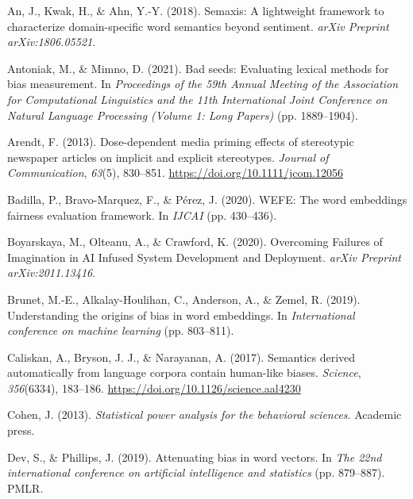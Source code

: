 \documentclass[english,man]{apa6}
\begin{document}
\begingroup
\setlength{\parindent}{-0.5in}
\setlength{\leftskip}{0.5in}

\hypertarget{refs}{}
\leavevmode\hypertarget{ref-an2018semaxis}{}%
An, J., Kwak, H., \& Ahn, Y.-Y. (2018). Semaxis: A lightweight framework to characterize domain-specific word semantics beyond sentiment. \emph{arXiv Preprint arXiv:1806.05521}.

\leavevmode\hypertarget{ref-antoniak2021bad}{}%
Antoniak, M., \& Mimno, D. (2021). Bad seeds: Evaluating lexical methods for bias measurement. In \emph{Proceedings of the 59th Annual Meeting of the Association for Computational Linguistics and the 11th International Joint Conference on Natural Language Processing (Volume 1: Long Papers)} (pp. 1889--1904).

\leavevmode\hypertarget{ref-arendt:2013:DDM}{}%
Arendt, F. (2013). Dose-dependent media priming effects of stereotypic newspaper articles on implicit and explicit stereotypes. \emph{Journal of Communication}, \emph{63}(5), 830--851. \url{https://doi.org/10.1111/jcom.12056}

\leavevmode\hypertarget{ref-badilla2020wefe}{}%
Badilla, P., Bravo-Marquez, F., \& Pérez, J. (2020). WEFE: The word embeddings fairness evaluation framework. In \emph{IJCAI} (pp. 430--436).

\leavevmode\hypertarget{ref-boyarskaya2020overcoming}{}%
Boyarskaya, M., Olteanu, A., \& Crawford, K. (2020). Overcoming Failures of Imagination in AI Infused System Development and Deployment. \emph{arXiv Preprint arXiv:2011.13416}.

\leavevmode\hypertarget{ref-brunet2019understanding}{}%
Brunet, M.-E., Alkalay-Houlihan, C., Anderson, A., \& Zemel, R. (2019). Understanding the origins of bias in word embeddings. In \emph{International conference on machine learning} (pp. 803--811).

\leavevmode\hypertarget{ref-caliskan:2017:S}{}%
Caliskan, A., Bryson, J. J., \& Narayanan, A. (2017). Semantics derived automatically from language corpora contain human-like biases. \emph{Science}, \emph{356}(6334), 183--186. \url{https://doi.org/10.1126/science.aal4230}

\leavevmode\hypertarget{ref-cohen2013statistical}{}%
Cohen, J. (2013). \emph{Statistical power analysis for the behavioral sciences}. Academic press.

\leavevmode\hypertarget{ref-dev2019attenuating}{}%
Dev, S., \& Phillips, J. (2019). Attenuating bias in word vectors. In \emph{The 22nd international conference on artificial intelligence and statistics} (pp. 879--887). PMLR.
\end{document}
